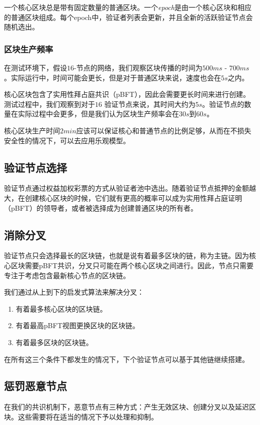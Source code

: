 \documentclass[8pt,fleqn,openany]{book}
\begin{document}
\begin{CJK*}{UTF8}{gbsn}
一个核心区块总是带有固定数量的普通区块。一个\textit{epoch}是由一个核心区块和相应的普通区块组成。每个epoch中，验证者列表会更新，并且全新的活跃验证节点会随机选出。

\subsubsection{区块生产频率}
在测试环境下，假设$16$-节点的网络，我们观察区块传播的时间为$500ms$ - $700ms$。实际运行中，时间可能会更长，但是对于普通区块来说，速度也会在$5s$之内。

核心区块包含了实用性拜占庭共识（pBFT），因此会需要更长时间来进行创建。测试过程中，我们观察到对于$16$ 验证节点来说，其时间大约为$5s$。验证节点的数量在实际过程中会更多，但是我们认为区块生产频率会在$30s$到$60s$。

核心区块生产时间$2min$应该可以保证核心和普通节点的比例足够，从而在不损失安全性的情况下，可以去应用乐观模型。

\subsection{验证节点选择}
验证节点通过权益加权彩票的方式从验证者池中选出。随着验证节点抵押的金额越大，在创建核心区块的时候，它们就有更高的概率可以成为实用性拜占庭证明（pBFT）的领导者，或者被选择成为创建普通区块的所有者。

\subsection{消除分叉}
验证节点只会选择最长的区块链，也就是说有着最多区块的链，称为主链。因为核心区块需要pBFT共识，分叉只可能在两个核心区块之间进行。因此，节点只需要专注于考虑包含最新核心节点的区块链。

我们通过从上到下的启发式算法来解决分叉：

\begin{enumerate}
	\item 有着最多核心区块的区块链。
	\item 有着最高pBFT视图更换区块的区块链。
	\item 有着最多区块的区块链。
\end{enumerate}

在所有这三个条件下都发生的情况下，下个验证节点可以基于其他链继续搭建。

\subsection{惩罚恶意节点}
在我们的共识机制下，恶意节点有三种方式：产生无效区块、创建分叉以及延迟区块。这些需要将在适当的情况下予以处理和抑制。


\end{CJK*}
\end{document}
